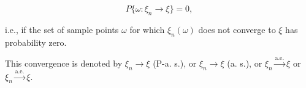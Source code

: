 $$P\{\omega : \xi_n \rightarrow \xi\} = 0,$$

i.e., if the set of sample points $\omega$ for which $\xi_n(\omega)$ does not converge to $\xi$ has probability zero.

This convergence is denoted by $\xi_n \rightarrow \xi$ (P-a. s.), or $\xi_n \rightarrow \xi$ (a. s.), or $\xi_n \xrightarrow{\text{a.e.}} \xi$ or $\xi_n \xrightarrow{\text{a.e.}} \xi$.

